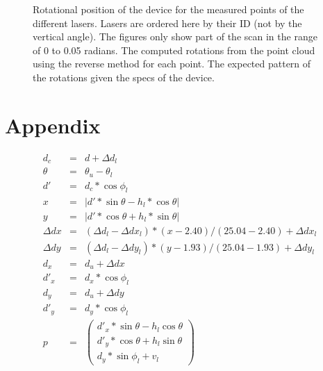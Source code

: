 \documentclass[english]{article}
\begin{document}
\begin{figure}
  \begin{center}
    \caption{Rotational position of the device for the measured points of the
    different lasers.
    Lasers are ordered here by their ID (not by the vertical angle). The figures
    only show part of the scan in the range of 0 to 0.05 radians.
     The computed rotations from the point
    cloud using the reverse method for each point.
     The expected pattern of the rotations
    given the specs of the device.}
		\label{fig:raw_meas}
  \end{center}
\end{figure}





\section*{Appendix}

\begin{eqnarray}
  d_c &=& d + \Delta d_l \nonumber \\
  \theta &=& \theta_u - \theta_l \nonumber \\
  d' &=& d_c * \cos{\phi_l} \nonumber \\
  x &=& |d' * \sin{\theta} - h_l * \cos{\theta}| \nonumber \\
  y &=& |d' * \cos{\theta} + h_l * \sin{\theta}| \nonumber \\
  \Delta dx &=& (\Delta d_l - \Delta dx_l) * (x - 2.40) / (25.04 - 2.40) + \Delta dx_l \nonumber \\
  \Delta dy &=& (\Delta d_l - \Delta dy_l) * (y - 1.93) / (25.04 - 1.93) + \Delta dy_l \nonumber \\
  d_x &=& d_u + \Delta dx \nonumber \\
  d'_x &=& d_x * \cos{\phi_l} \nonumber \\
  d_y &=& d_u + \Delta dy \nonumber \\
  d'_y &=& d_y * \cos{\phi_l} \nonumber \\
  p &=&  \left(
           \begin{array}{c}
             d'_x * \sin{\theta} - h_l \cos{\theta} \nonumber \\
             d'_y * \cos{\theta} + h_l \sin{\theta} \nonumber \\
             d_y * \sin{\phi_l} + v_l
           \end{array}
         \right)
\end{eqnarray}
\end{document}
